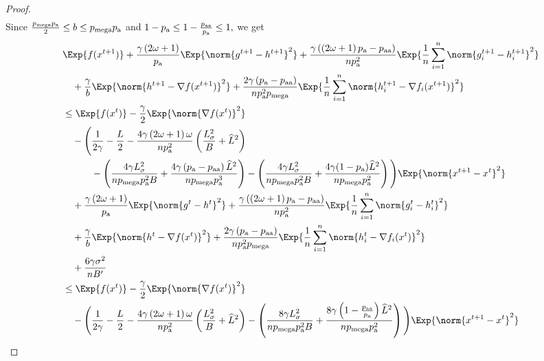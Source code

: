 \documentclass{article}
\newcommand*{\probavailable}{\ensuremath{p_{\textnormal{a}}}}
\newcommand*{\probpairaa}{\ensuremath{p_{\textnormal{aa}}}}
\newcommand*{\probmega}{\ensuremath{p_{\text{mega}}}}
\begin{document}
\begin{proof}
\begin{align*}
  \end{align*}
  Since $\frac{\probmega \probavailable}{2} \leq b \leq \probmega \probavailable$ and $1 - \probavailable \leq 1 - \frac{\probpairaa}{\probavailable}\leq 1,$ we get 
  \begin{align*}
    &\Exp{f(x^{t + 1})} + \frac{\gamma \left(2 \omega + 1\right)}{\probavailable} \Exp{\norm{g^{t+1} - h^{t+1}}^2} + \frac{\gamma\left(\left(2 \omega + 1\right)\probavailable - \probpairaa\right)}{n \probavailable^2} \Exp{\frac{1}{n}\sum_{i=1}^n\norm{g^{t+1}_i - h^{t+1}_i}^2}\\
    &\quad  + \frac{\gamma}{b} \Exp{\norm{h^{t+1} - \nabla f(x^{t+1})}^2} + \frac{2 \gamma \left(\probavailable - \probpairaa\right)}{n \probavailable^2 \probmega} \Exp{\frac{1}{n}\sum_{i=1}^n\norm{h^{t+1}_i - \nabla f_i(x^{t+1})}^2}\\
    &\leq \Exp{f(x^t)} - \frac{\gamma}{2}\Exp{\norm{\nabla f(x^t)}^2} \\
    &\quad - \Bigg(\frac{1}{2\gamma} - \frac{L}{2} - \frac{4 \gamma \left(2\omega + 1\right) \omega}{n \probavailable^2}\left(\frac{L_{\sigma}^2}{B} + \widehat{L}^2\right) \\
    &\qquad\quad - \left(\frac{4 \gamma L_{\sigma}^2}{n \probmega \probavailable^2 B} + \frac{4\gamma\left(\probavailable - \probpairaa\right) \widehat{L}^2}{n \probmega \probavailable^3}\right) - \left(\frac{4 \gamma L_{\sigma}^2}{n \probmega \probavailable^2 B} + \frac{4 \gamma (1 - \probavailable) \widehat{L}^2}{n \probmega \probavailable^2}\right)\Bigg) \Exp{\norm{x^{t+1} - x^t}^2} \\
    &\quad + \frac{\gamma \left(2 \omega + 1\right)}{\probavailable} \Exp{\norm{g^{t} - h^{t}}^2} + \frac{\gamma\left(\left(2 \omega + 1\right)\probavailable - \probpairaa\right)}{n \probavailable^2}\Exp{\frac{1}{n}\sum_{i=1}^n\norm{g^{t}_i - h^{t}_i}^2} \\
    &\quad + \frac{\gamma}{b} \Exp{\norm{h^{t} - \nabla f(x^{t})}^2} + \frac{2 \gamma \left(\probavailable - \probpairaa\right)}{n \probavailable^2 \probmega}\Exp{\frac{1}{n}\sum_{i=1}^n\norm{h^{t}_i - \nabla f_i(x^{t})}^2} \\
    &\quad + \frac{6 \gamma \sigma^2}{n B'} \\
    &\leq \Exp{f(x^t)} - \frac{\gamma}{2}\Exp{\norm{\nabla f(x^t)}^2} \\
    &\quad - \Bigg(\frac{1}{2\gamma} - \frac{L}{2} - \frac{4 \gamma \left(2\omega + 1\right) \omega}{n \probavailable^2}\left(\frac{L_{\sigma}^2}{B} + \widehat{L}^2\right) - \left(\frac{8 \gamma L_{\sigma}^2}{n \probmega \probavailable^2 B} + \frac{8\gamma\left(1 - \frac{\probpairaa}{\probavailable}\right) \widehat{L}^2}{n \probmega \probavailable^2}\right)\Bigg) \Exp{\norm{x^{t+1} - x^t}^2} \\

\end{align*}
\end{proof}
\end{document}

